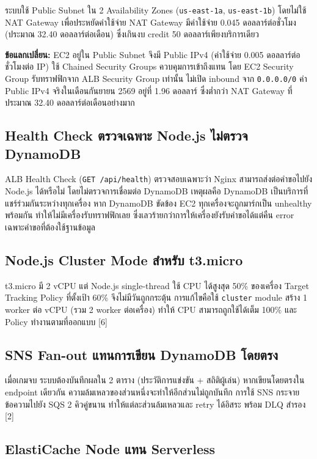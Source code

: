 \documentclass[12pt,a4paper]{report}
\begin{document}
ระบบใช้ Public Subnet ใน 2 Availability Zones (\texttt{us-east-1a}, \texttt{us-east-1b}) โดยไม่ใช้ NAT Gateway เพื่อประหยัดค่าใช้จ่าย NAT Gateway มีค่าใช้จ่าย 0.045 ดอลลาร์ต่อชั่วโมง (ประมาณ 32.40 ดอลลาร์ต่อเดือน) ซึ่งเกินงบ credit 50 ดอลลาร์เพียงบริการเดียว

\textbf{ข้อแลกเปลี่ยน:} EC2 อยู่ใน Public Subnet จึงมี Public IPv4 (ค่าใช้จ่าย 0.005 ดอลลาร์ต่อชั่วโมงต่อ IP) ใช้ Chained Security Groups ควบคุมการเข้าถึงแทน โดย EC2 Security Group รับทราฟฟิกจาก ALB Security Group เท่านั้น ไม่เปิด inbound จาก \texttt{0.0.0.0/0} ค่า Public IPv4 จริงในเดือนกันยายน 2569 อยู่ที่ 1.96 ดอลลาร์ ซึ่งต่ำกว่า NAT Gateway ที่ประมาณ 32.40 ดอลลาร์ต่อเดือนอย่างมาก

\subsection{Health Check ตรวจเฉพาะ Node.js ไม่ตรวจ DynamoDB}

ALB Health Check (\texttt{GET /api/health}) ตรวจสอบเฉพาะว่า Nginx สามารถส่งต่อคำขอไปยัง Node.js ได้หรือไม่ โดยไม่ตรวจการเชื่อมต่อ DynamoDB เหตุผลคือ DynamoDB เป็นบริการที่แชร์ร่วมกันระหว่างทุกเครื่อง หาก DynamoDB ขัดข้อง EC2 ทุกเครื่องจะถูกมาร์กเป็น unhealthy พร้อมกัน ทำให้ไม่มีเครื่องรับทราฟฟิกเลย ซึ่งเลวร้ายกว่าการให้เครื่องยังรับคำขอได้แต่คืน error เฉพาะคำขอที่ต้องใช้ฐานข้อมูล

\subsection{Node.js Cluster Mode สำหรับ t3.micro}

t3.micro มี 2 vCPU แต่ Node.js single-thread ใช้ CPU ได้สูงสุด 50\% ของเครื่อง Target Tracking Policy ที่ตั้งเป้า 60\% จึงไม่มีวันถูกกระตุ้น การแก้ไขคือใช้ \texttt{cluster} module สร้าง 1 worker ต่อ vCPU (รวม 2 worker ต่อเครื่อง) ทำให้ CPU สามารถถูกใช้ได้เต็ม 100\% และ Policy ทำงานตามที่ออกแบบ [6]

\subsection{SNS Fan-out แทนการเขียน DynamoDB โดยตรง}

เมื่อเกมจบ ระบบต้องบันทึกผลใน 2 ตาราง (ประวัติการแข่งขัน + สถิติผู้เล่น) หากเขียนโดยตรงใน endpoint เดียวกัน ความล้มเหลวของส่วนหนึ่งจะทำให้อีกส่วนไม่ถูกบันทึก การใช้ SNS กระจายข้อความไปยัง SQS 2 คิวคู่ขนาน ทำให้แต่ละส่วนล้มเหลวและ retry ได้อิสระ พร้อม DLQ สำรอง [2]

\subsection{ElastiCache Node แทน Serverless}
\end{document}
